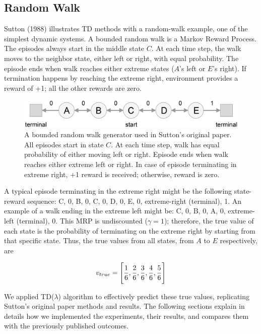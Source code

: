 \documentclass{article}
\begin{document}
\subsection{Random Walk}
\label{subsec:randomwalk}
Sutton (1988) illustrates TD methods with a random-walk example, one of the simplest dynamic systems.
A bounded random walk is a Markov Reward Process.
The episodes always start in the middle state $C$.
At each time step, the walk moves to the neighbor state, either left or right, with equal probability.
The episode ends when walk reaches either extreme states ($A$'s left or $E$'s right).
If termination happens by reaching the extreme right, environment provides a reward of +1;
all the other rewards are zero.

\begin{figure}[t]
    \includegraphics[scale=0.3]{./images/random_walk2.eps}
    \centering
    \caption{A bounded random walk generator used in Sutton's original paper.
    All episodes start in state $C$.
    At each time step, walk has equal probability of either moving left or right.
    Episode ends when walk reaches either extreme left or right.
    In case of episode terminating in extreme right, +1 reward is received;
    otherwise, reward is zero.}
    \label{fig:1}
\end{figure}

A typical episode terminating in the extreme right might be the following state-reward sequence: C, 0, B, 0, C, 0, D, 0, E, 0, extreme-right (terminal), 1.
An example of a walk ending in the extreme left might be: C, 0, B, 0, A, 0, extreme-left (terminal), 0.
This MRP is undiscounted ($\gamma = 1$);
therefore, the true value of each state is the probability of terminating on the extreme right by starting from that specific state.
Thus, the true values from all states, from $A$ to $E$ respectively, are

\begin{equation}
    v_{true} = \Bigg[\frac{1}{6}, \frac{2}{6}, \frac{3}{6}, \frac{4}{6}, \frac{5}{6}\Bigg]
    \centering
\end{equation}

We applied TD($\lambda$) algorithm to effectively predict these true values, replicating Sutton's original paper methods and results.
The following sections explain in details how we implemented the experiments, their results, and compares them with the previously published outcomes.
\end{document}
